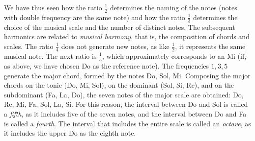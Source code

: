 We have thus seen how the ratio $\frac 1 2$ determines the naming of the notes
(notes with double frequency are the same note) and how the ratio $\frac 1 3$
determines the choice of the musical scale and the number of distinct notes. The
subsequent harmonics are related to \emph{musical harmony}, that is, the
composition of chords and scales. The ratio $\frac 1 4$ does not generate new
notes, as like $\frac 1 2$, it represents the same musical note. The next ratio
is $\frac 1 5$, which approximately corresponds to an Mi (if, as above, we have
chosen Do as the reference note). The frequencies $1,3,5$ generate the major
chord, formed by the notes Do, Sol, Mi. Composing the major chords on the tonic
(Do, Mi, Sol), on the dominant (Sol, Si, Re), and on the subdominant (Fa, La,
Do), the seven notes of the major scale are obtained: Do, Re, Mi, Fa, Sol, La,
Si. For this reason, the interval between Do and Sol is called a \emph{fifth},
as it includes five of the seven notes, and the interval between Do and Fa is
called a \emph{fourth}. The interval that includes the entire scale is called an
\emph{octave}, as it includes the upper Do as the eighth note.